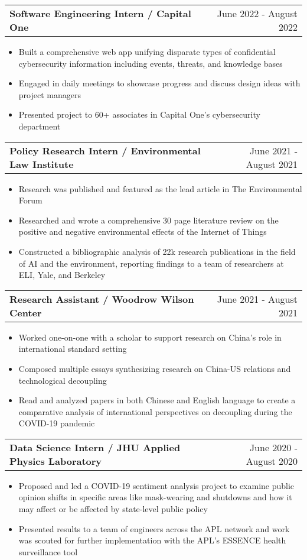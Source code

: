 \documentclass[letterpaper,11pt]{article}
\makeatletter
\newcommand{\resumeItem}[1]{
  \item\small{
    {#1} \vspace{-2pt}
  }
}
\newcommand{\resumeSubheadingTwo}[2]{
  \vspace{-1pt}\item
    \begin{tabular*}{0.97\textwidth}{l@{\extracolsep{\fill}}r}
      \textbf{#1} & #2 \\
    \end{tabular*}\vspace{-5pt}
}
\newcommand{\resumeItemListStart}{\begin{itemize}}
\newcommand{\resumeItemListEnd}{\end{itemize}\vspace{-5pt}}
\makeatother
\begin{document}
    \resumeSubheadingTwo
      {Software Engineering Intern / Capital One}{June 2022 - August 2022}
      \resumeItemListStart
        \resumeItem{Built a comprehensive web app unifying disparate types of confidential cybersecurity information including events, threats, and knowledge bases}
        \resumeItem{Engaged in daily meetings to showcase progress and discuss design ideas with project managers}
        \resumeItem{Presented project to 60+ associates in Capital One's cybersecurity department}
      \resumeItemListEnd

    \resumeSubheadingTwo
      {Policy Research Intern / Environmental Law Institute}{June 2021 - August 2021}
      \resumeItemListStart
        \resumeItem{Research was published and featured as the lead article in The Environmental Forum}
        \resumeItem{Researched and wrote a comprehensive 30 page literature review on the positive and negative environmental effects of the Internet of Things}
        \resumeItem{Constructed a bibliographic analysis of 22k research publications in the field of AI and the environment, reporting findings to a team of researchers at ELI, Yale, and Berkeley}
      \resumeItemListEnd

    \resumeSubheadingTwo
      {Research Assistant / Woodrow Wilson Center}{June 2021 - August 2021}
      \resumeItemListStart
        \resumeItem{Worked one-on-one with a scholar to support research on China's role in international standard setting}
        \resumeItem{Composed multiple essays synthesizing research on China-US relations and technological decoupling}
        \resumeItem{Read and analyzed papers in both Chinese and English language to create a comparative analysis of international perspectives on decoupling during the COVID-19 pandemic}
      \resumeItemListEnd

    \resumeSubheadingTwo
      {Data Science Intern / JHU Applied Physics Laboratory}{June 2020 - August 2020}
      \resumeItemListStart
        \resumeItem{Proposed and led a COVID-19 sentiment analysis project to examine public opinion shifts in specific areas like mask-wearing and shutdowns and how it may affect or be affected by state-level public policy}
        \resumeItem{Presented results to a team of engineers across the APL network and work was scouted for further implementation with the APL's ESSENCE health surveillance tool}
      \resumeItemListEnd
      
\end{document}
